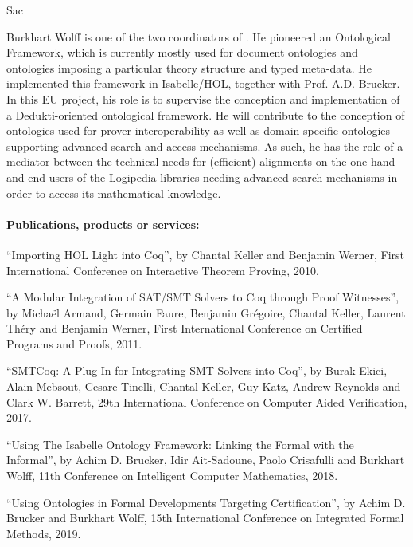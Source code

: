 \begin{sitedescription}{Sac}
\begin{compactitem}
\item Burkhart Wolff is one of the two coordinators of . He
pioneered an Ontological Framework, which is currently mostly used for
document ontologies and ontologies imposing a particular theory
structure and typed meta-data. He implemented this framework in
Isabelle/HOL, together with Prof. A.D. Brucker. In this EU project, his
role is to supervise the conception and implementation of a
Dedukti-oriented ontological framework. He will contribute to the
conception of ontologies used for prover interoperability as well as
domain-specific ontologies supporting advanced search and access
mechanisms. As such, he has the role of a mediator between the technical
needs for (efficient) alignments on the one hand and end-users of the
Logipedia libraries needing advanced search mechanisms in order to
access its mathematical knowledge.
\end{compactitem}

\paragraph*{Publications, products or services:}

\begin{compactitem}
\item ``Importing HOL Light into Coq'', by Chantal Keller and Benjamin
  Werner, First International Conference on Interactive Theorem Proving,
  2010.
\item ``A Modular Integration of SAT/SMT Solvers to Coq through Proof
  Witnesses'', by Michaël Armand, Germain Faure, Benjamin Grégoire,
  Chantal Keller, Laurent Théry and Benjamin Werner, First International
  Conference on Certified Programs and Proofs, 2011.
\item ``SMTCoq: A Plug-In for Integrating SMT Solvers into Coq'', by
  Burak Ekici, Alain Mebsout, Cesare Tinelli, Chantal Keller, Guy Katz,
  Andrew Reynolds and Clark W. Barrett, 29th International Conference on
  Computer Aided Verification, 2017.
\item ``Using The Isabelle Ontology Framework: Linking the Formal with
  the Informal'', by Achim D. Brucker, Idir Ait-Sadoune, Paolo
  Crisafulli and Burkhart Wolff, 11th Conference on Intelligent Computer
  Mathematics, 2018.
\item ``Using Ontologies in Formal Developments Targeting
  Certification'', by Achim D. Brucker and Burkhart Wolff, 15th
  International Conference on Integrated Formal Methods, 2019.
\end{compactitem}


\end{sitedescription}

